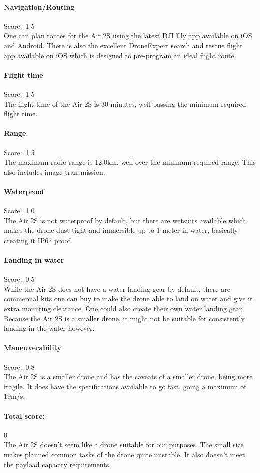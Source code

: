 \paragraph{Navigation/Routing}\mbox{Score: 1.5} \\
One can plan routes for the Air 2S using the latest DJI Fly app \cite{djifly} available on iOS and Android. There is also the excellent DroneExpert search and rescue flight app available on iOS which is designed to pre-program an ideal flight route. \cite{desar}

\paragraph{Flight time}\mbox{Score: 1.5} \\
The flight time of the Air 2S is 30 minutes, well passing the minimum required flight time.

\paragraph{Range}\mbox{Score: 1.5} \\
The maximum radio range is 12.0km, well over the minimum required range. This also includes image transmission.

\paragraph{Waterproof}\mbox{Score: 1.0} \\
The Air 2S is not waterproof by default, but there are wetsuits available which makes the drone dust-tight and immersible up to 1 meter in water, basically creating it IP67 proof. \cite{air2swetsuit}

\paragraph{Landing in water}\mbox{Score: 0.5} \\
While the Air 2S does not have a water landing gear by default, there are commercial kits one can buy to make the drone able to land on water and give it extra mounting clearance. \cite{air2slandinggear} One could also create their own water landing gear. \cite{diylanding} Because the Air 2S is a smaller drone, it might not be suitable for consistently landing in the water however.

\paragraph{Maneuverability}\mbox{Score: 0.8} \\
The Air 2S is a smaller drone and has the caveats of a smaller drone, being more fragile. It does have the specifications available to go fast, going a maximum of 19m/s.

\paragraph{Total score:}\mbox{0} \\
The Air 2S doesn't seem like a drone suitable for our purposes. The small size makes planned common tasks of the drone quite unstable. It also doesn't meet the payload capacity requirements.